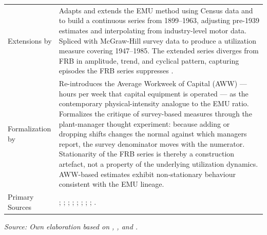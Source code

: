 \begin{table}[!h]
\begin{tabular}{p{3.2cm} p{10.5cm}}
		Extensions by \citet{Shaikh1992} &
		Adapts and extends the EMU method using Census data and
		\citet{Christensen1969} to build a continuous series from
		1899--1963, adjusting pre-1939 estimates and interpolating from
		industry-level motor data. Spliced with McGraw-Hill survey data to
		produce a utilization measure covering 1947--1985. The extended
		series diverges from FRB in amplitude, trend, and cyclical
		pattern, capturing episodes the FRB series suppresses
		\citep[Appendix~6.6]{Shaikh2016}. \\[4pt]
		
		Formalization by \citet{Nikiforos2016} &
		Re-introduces the Average Workweek of Capital (AWW) --- hours per
		week that capital equipment is operated --- as the contemporary
		physical-intensity analogue to the EMU ratio. Formalizes the
		critique of survey-based measures through the plant-manager
		thought experiment: because adding or dropping shifts changes the
		normal against which managers report, the survey denominator moves
		with the numerator. Stationarity of the FRB series is thereby a
		construction artefact, not a property of the underlying utilization
		dynamics. AWW-based estimates exhibit non-stationary behaviour
		consistent with the EMU lineage. \\[4pt]
		
		Primary Sources &
		\citet{USfpc1945}; \citet{UScensus1966}; \citet{UScensus1967};
		\citet{UScensus1975}; \citet{USdc1986}; \citet{Christensen1969};
		\citet{Foss1963}; \citet{Shaikh1992,Shaikh2016};
		\citet{Nikiforos2016}. \\
		
		\bottomrule
	\end{tabular}
	\smallskip
	
	\noindent\textit{Source: Own elaboration based on \citet{Foss1963},
		\citet{Shaikh1992,Shaikh2016}, and \citet{Nikiforos2016}.}
\end{table}
